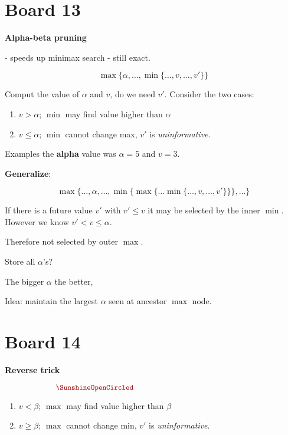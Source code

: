 \documentclass[10pt]{article}
\begin{document}
\section{Board 13}

\textbf{Alpha-beta pruning} 

- speeds up minimax search
- still exact.

\[ \max\{ \alpha, \ldots,  \min\{\ldots, v, \ldots, v' \} \}\]
  
\noindent Comput the value of $\alpha$ and $v$, do we need $v'$. Consider the two cases:

\begin{enumerate}
\item  $v > \alpha$;  $\min$ may find value higher than $\alpha$ 
\item  $v \leq \alpha$;  $\min$ cannot change max,  $v'$ is \textit{uninformative}. 
\end{enumerate}

Examples the \textbf{alpha} value was $\alpha = 5$ and $v=3$. 

\textbf{Generalize}:

\[ \max\{ \ldots, \alpha, \ldots, \min\{ \max\{\ldots \min\{\ldots, v, \ldots, v' \} \}\} , \ldots\}\]

If there is a future value $v'$ with $v' \leq v$ it may be selected by the inner $\min$. However we know $v' < v \leq \alpha$.

Therefore not selected by outer $\max$. 

Store all $\alpha$'s? 

The bigger $\alpha$ the better,

Idea: maintain the largest $\alpha$ seen at ancestor $\max$ node. 

% 

\section{Board 14}

\textbf{Reverse trick}



\[ \censorm{\min\{ \ldots, \beta, \ldots, \max\{ \min\{\ldots \max\{\ldots, v, \ldots, v' \} \}\} , \ldots\} }\]


\begin{enumerate}
\item  $v < \beta$;  $\max$ may find value higher than $\beta$ 
\item  $v \geq \beta$;  $\max$ cannot change min,  $v'$ is \textit{uninformative}. 
\end{enumerate}
\end{document}
